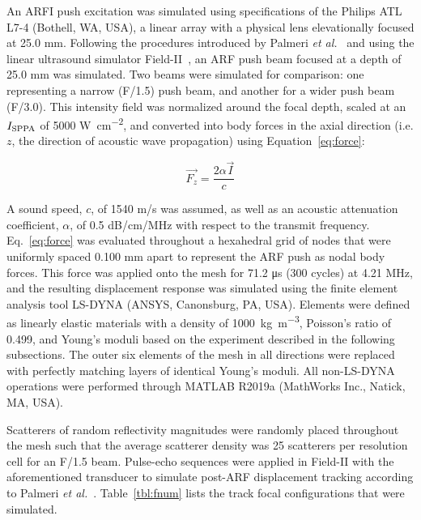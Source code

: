 An ARFI push excitation was simulated using specifications of the Philips ATL L7-4 (Bothell, WA, USA), a linear array with a physical lens elevationally focused at 25.0 mm. Following the procedures introduced by Palmeri \emph{et al.}~\cite{palmeri_Experimental_2004,palmeri_Ultrasonic_2006} and using the linear ultrasound simulator Field-II~\cite{jensen_Calculation_1992,jensen_Field_1997}, an ARF push beam focused at a depth of 25.0 \si{\milli\meter} was simulated. Two beams were simulated for comparison: one representing a narrow (F/1.5) push beam, and another for a wider push beam (F/3.0). This intensity field was normalized around the focal depth, scaled at an $I_{\textnormal{SPPA}}$ of 5000 \si{\watt\per\square\centi\meter}, and converted into body forces in the axial direction (i.e. $z$, the direction of acoustic wave propagation) using Equation~\ref{eq:force}:

\begin{equation}
\vec{F_{z}} = \frac{2 \alpha \vec{I}}{c}
\label{eq:force}
\end{equation}

A sound speed, $c$, of 1540 m/s was assumed, as well as an acoustic attenuation coefficient, $\alpha$, of 0.5 dB/cm/MHz with respect to the transmit frequency. Eq.~\ref{eq:force} was evaluated throughout a hexahedral grid of nodes that were uniformly spaced 0.100 mm apart to represent the ARF push as nodal body forces. This force was applied onto the mesh for 71.2 \si{\micro\second} (300 cycles) at 4.21 MHz, and the resulting displacement response was simulated using the finite element analysis tool LS-DYNA (ANSYS, Canonsburg, PA, USA). Elements were defined as linearly elastic materials with a density of 1000~\si{\kilo\gram\per\cubic\meter}, Poisson's ratio of 0.499, and Young's moduli based on the experiment described in the following subsections. The outer six elements of the mesh in all directions were replaced with perfectly matching layers of identical Young's moduli. All non-LS-DYNA operations were performed through MATLAB R2019a (MathWorks Inc., Natick, MA, USA).

Scatterers of random reflectivity magnitudes were randomly placed throughout the mesh such that the average scatterer density was 25 scatterers per resolution cell for an F/1.5 beam. Pulse-echo sequences were applied in Field-II with the aforementioned transducer to simulate post-ARF displacement tracking according to Palmeri \emph{et al.}~\cite{palmeri_Ultrasonic_2006}. Table~\ref{tbl:fnum} lists the track focal configurations that were simulated.

